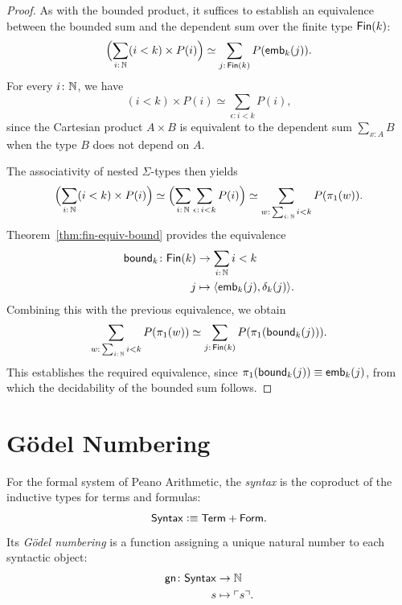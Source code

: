 \begin{proof}
    As with the bounded product, it suffices to establish an equivalence between the bounded sum and the dependent sum over the finite type $\mathsf{Fin}(k)$:
    \[
        \Bigl(
            \sum_{i\colon\N}(i<k)\times P(i)
        \Bigr)
        \simeq
        \sum_{j\colon\fun{Fin}(k)}P(\fun{emb}_k(j)).
    \]
    For every $i\colon\N$, we have
    \[
        (i<k)\times P(i)
            \simeq\sum_{\epsilon\colon i<k}P(i),
    \]
    since the Cartesian product $A\times B$ is equivalent to the dependent sum $\sum_{x\colon A}B$ when the type $B$ does not depend on $A$.
    
    The associativity of nested $\Sigma$-types then yields
    \[
        \Bigl(
            \sum_{i\colon\N}(i<k)\times P(i)
        \Bigr)
        \simeq
        \Bigl(
            \sum_{i\colon\N}\sum_{\epsilon\colon i<k}P(i)
        \Bigr)
        \simeq
        \sum_{w\colon\sum_{i\colon\N}i<k}P(\pi_1(w)).
    \]
    Theorem~\ref{thm:fin-equiv-bound} provides the equivalence
    \begin{align*}
        \fun{bound}_k\colon\fun{Fin}(k)
            &\to\sum_{i\colon\N}i<k\\
        j&\mapsto\dep{\fun{emb}_k(j),\delta_k(j)}.
    \end{align*}
    Combining this with the previous equivalence, we obtain
    \[
        \sum_{w\colon\sum_{i\colon\N}i<k}P(\pi_1(w))
        \simeq
        \sum_{j\colon\fun{Fin}(k)}
            P(\pi_1(\fun{bound}_k(j))).
    \]
    This establishes the required equivalence, since $\pi_1(\mathsf{bound}_k(j))\equiv\mathsf{emb}_k(j)$, from which the decidability of the bounded sum follows.
\end{proof}

\section{G\"odel Numbering}

\begin{defn}
    For the formal system of Peano Arithmetic, the \textsl{syntax} is the coproduct of the inductive types for terms and formulas:
    \[
        \mathsf{Syntax}\mathrel{\vcentcolon}\equiv\mathsf{Term}+\mathsf{Form}.
    \]
    Its \textsl{G\"odel numbering} is a function assigning a unique natural number to each syntactic object:
    \begin{align*}
        \fun{gn}\colon\fun{Syntax}&\to\N\\
        s&\mapsto\gn{s}.
    \end{align*}
\end{defn}

